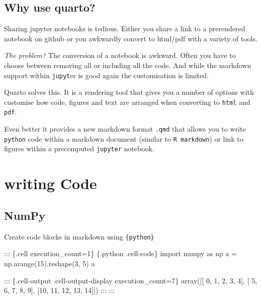 \documentclass[
  letterpaper,
  DIV=11,
  numbers=noendperiod,
  oneside]{scrartcl}
\newenvironment{Shaded}{\begin{snugshade}}{\end{snugshade}}
\newcommand{\DecValTok}[1]{\textcolor[rgb]{0.68,0.00,0.00}{#1}}
\newcommand{\ImportTok}[1]{\textcolor[rgb]{0.00,0.46,0.62}{#1}}
\newcommand{\InformationTok}[1]{\textcolor[rgb]{0.37,0.37,0.37}{#1}}
\newcommand{\NormalTok}[1]{\textcolor[rgb]{0.00,0.23,0.31}{#1}}
\newcommand{\OperatorTok}[1]{\textcolor[rgb]{0.37,0.37,0.37}{#1}}
\begin{document}
\hypertarget{why-use-quarto}{%
\subsection{Why use quarto?}\label{why-use-quarto}}

Sharing jupyter notebooks is tedious. Either you share a link to a
prerendered notebook on github or you awkwardly convert to html/pdf with
a variety of tools.

\emph{The problem?} The conversion of a notebook is awkward. Often you
have to choose between removing all or including all the code. And while
the markdown support within \texttt{jupyt}er is good again the
customisation is limited.

Quarto solves this. It is a rendering tool that gives you a number of
options with customise how code, figures and text are arranged when
converting to \texttt{html} and \texttt{pdf}.

Even better it provides a new markdown format \texttt{.qmd} that allows
you to write \texttt{python} code within a markdown document (similar to
\texttt{R\ markdown}) or link to figures within a precomputed
\texttt{jupyter} notebook.

\hypertarget{writing-code}{%
\section{writing Code}\label{writing-code}}

\hypertarget{numpy}{%
\subsection{NumPy}\label{numpy}}

Create code blocks in markdown using
\texttt{\textasciigrave{}\textasciigrave{}\textasciigrave{}\{python\}}

\begin{Shaded}
\begin{Highlighting}[]

\NormalTok{::: \{.cell execution\_count=1\}}
\InformationTok{\textasciigrave{}\textasciigrave{}\textasciigrave{} \{.python .cell{-}code\}}
\ImportTok{import}\NormalTok{ numpy }\ImportTok{as}\NormalTok{ np}
\NormalTok{a }\OperatorTok{=}\NormalTok{ np.arange(}\DecValTok{15}\NormalTok{).reshape(}\DecValTok{3}\NormalTok{, }\DecValTok{5}\NormalTok{)}
\NormalTok{a}
\InformationTok{\textasciigrave{}\textasciigrave{}\textasciigrave{}}

\NormalTok{::: \{.cell{-}output .cell{-}output{-}display execution\_count=7\}}
\InformationTok{\textasciigrave{}\textasciigrave{}\textasciigrave{}}
\InformationTok{array([[ 0,  1,  2,  3,  4],}
\InformationTok{       [ 5,  6,  7,  8,  9],}
\InformationTok{       [10, 11, 12, 13, 14]])}
\InformationTok{\textasciigrave{}\textasciigrave{}\textasciigrave{}}
\NormalTok{:::}
\NormalTok{:::}

\end{Highlighting}
\end{Shaded}
\end{document}
